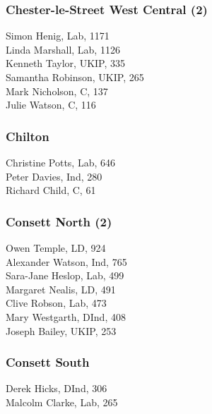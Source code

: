 \documentclass[a4paper,openany,10pt]{book}
\begin{document}
\subsubsection*{Chester-le-Street West Central (2)}



Simon Henig, Lab, 1171\\
Linda Marshall, Lab, 1126\\
Kenneth Taylor, UKIP, 335\\
Samantha Robinson, UKIP, 265\\
Mark Nicholson, C, 137\\
Julie Watson, C, 116\\


\subsubsection*{Chilton}



Christine Potts, Lab, 646\\
Peter Davies, Ind, 280\\
Richard Child, C, 61\\


\subsubsection*{Consett North (2)}



Owen Temple, LD, 924\\
Alexander Watson, Ind, 765\\
Sara-Jane Heslop, Lab, 499\\
Margaret Nealis, LD, 491\\
Clive Robson, Lab, 473\\
Mary Westgarth, DInd, 408\\
Joseph Bailey, UKIP, 253\\


\subsubsection*{Consett South}



Derek Hicks, DInd, 306\\
Malcolm Clarke, Lab, 265\\
\end{document}

